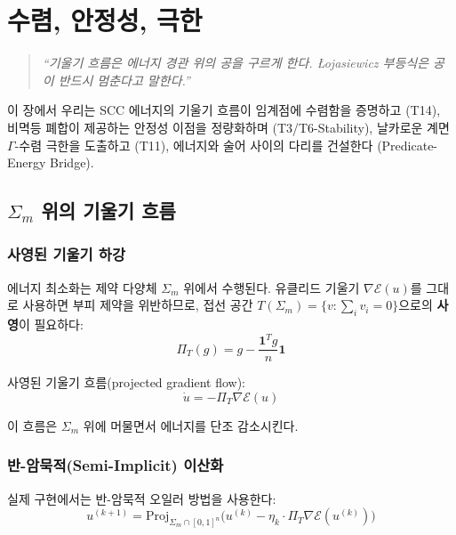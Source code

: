 
\chapter{수렴, 안정성, 극한}
\label{ch:convergence}

\begin{quote}
\textit{``기울기 흐름은 에너지 경관 위의 공을 구르게 한다. \L{}ojasiewicz 부등식은 공이 반드시 멈춘다고 말한다.''}
\end{quote}

이 장에서 우리는 SCC 에너지의 기울기 흐름이 임계점에 수렴함을 증명하고 (T14), 비멱등 폐합이 제공하는 안정성 이점을 정량화하며 (T3/T6-Stability), 날카로운 계면 $\Gamma$-수렴 극한을 도출하고 (T11), 에너지와 술어 사이의 다리를 건설한다 (Predicate-Energy Bridge).


\section{$\Sigma_m$ 위의 기울기 흐름}
\label{sec:gradient-flow}

\subsection{사영된 기울기 하강}

에너지 최소화는 제약 다양체 $\Sigma_m$ 위에서 수행된다. 유클리드 기울기 $\nabla \mathcal{E}(u)$를 그대로 사용하면 부피 제약을 위반하므로, 접선 공간 $T(\Sigma_m) = \{v : \sum_i v_i = 0\}$으로의 \textbf{사영}이 필요하다:
\begin{equation}
    \Pi_T(g) = g - \frac{\mathbf{1}^T g}{n} \mathbf{1}
    \label{eq:tangent-projection}
\end{equation}

사영된 기울기 흐름(projected gradient flow):
\begin{equation}
    \dot{u} = -\Pi_T \nabla \mathcal{E}(u)
    \label{eq:projected-gradient-flow}
\end{equation}

이 흐름은 $\Sigma_m$ 위에 머물면서 에너지를 단조 감소시킨다.

\subsection{반-암묵적(Semi-Implicit) 이산화}

실제 구현에서는 반-암묵적 오일러 방법을 사용한다:
\begin{equation}
    u^{(k+1)} = \mathrm{Proj}_{\Sigma_m \cap [0,1]^n}\!\Big(u^{(k)} - \eta_k \cdot \Pi_T \nabla \mathcal{E}(u^{(k)})\Big)
    \label{eq:semi-implicit}
\end{equation}

